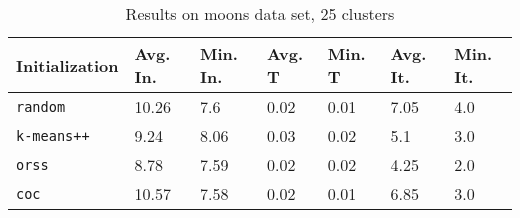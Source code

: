 \begin{table}[h]
	\begin{center}
		\begin{tabular}{|l|l|l|l|l|l|l|}
			\hline
			Initialization & Avg. In. & Min. In. & Avg. T & Min. T & Avg. It. & Min. It.\\\hline
			\texttt{random} & 10.26 & 7.6 & 0.02 & 0.01 & 7.05 & 4.0\\\hline
			\texttt{k-means++} & 9.24 & 8.06 & 0.03 & 0.02 & 5.1 & 3.0\\\hline
			\texttt{orss} & 8.78 & 7.59 & 0.02 & 0.02 & 4.25 & 2.0\\\hline
			\texttt{coc} & 10.57 & 7.58 & 0.02 & 0.01 & 6.85 & 3.0\\\hline
		\end{tabular}
		\caption{Results on moons data set, 25 clusters}
		\label{tbl:moons25}
	\end{center}
\end{table}


